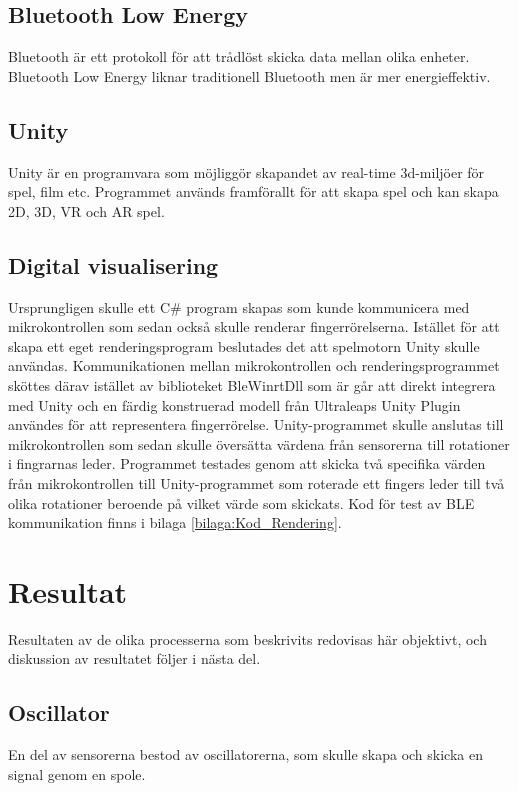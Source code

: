 \documentclass[a4paper]{article}
\begin{document}
\begin{sloppypar}
    \subsection{Bluetooth Low Energy}
    Bluetooth är ett protokoll för att trådlöst skicka data mellan olika enheter. Bluetooth Low Energy liknar traditionell Bluetooth men är mer energieffektiv.~\cite{Bluetooth}

    \subsection{Unity}
    Unity är en programvara som möjliggör skapandet av real-time 3d-miljöer för spel, film etc. Programmet används framförallt för att skapa spel och kan skapa 2D, 3D, VR och AR spel.~\cite{Unity}

    \subsection{Digital visualisering}
    Ursprungligen skulle ett C\# program skapas som kunde kommunicera med mikrokontrollen som sedan också skulle renderar fingerrörelserna.
    Istället för att skapa ett eget renderingsprogram beslutades det att spelmotorn Unity skulle användas.
    Kommunikationen mellan mikrokontrollen och renderingsprogrammet sköttes därav istället av biblioteket BleWinrtDll som är går att direkt integrera med Unity
    och en färdig konstruerad modell från Ultraleaps Unity Plugin användes för att representera fingerrörelse.
    Unity-programmet skulle anslutas till mikrokontrollen som sedan skulle översätta värdena från sensorerna till rotationer i fingrarnas leder.
    Programmet testades genom att skicka två specifika värden från mikrokontrollen till Unity-programmet som roterade ett fingers leder till två olika rotationer beroende på vilket värde som skickats.
    Kod för test av BLE kommunikation finns i bilaga \ref{bilaga:Kod_Rendering}.


    \newpage

    \section{Resultat}
    Resultaten av de olika processerna som beskrivits redovisas här objektivt, och diskussion av resultatet följer i nästa del.
    \subsection{Oscillator}
    En del av sensorerna bestod av oscillatorerna, som skulle skapa och skicka en signal genom en spole.

\end{sloppypar}
\end{document}
